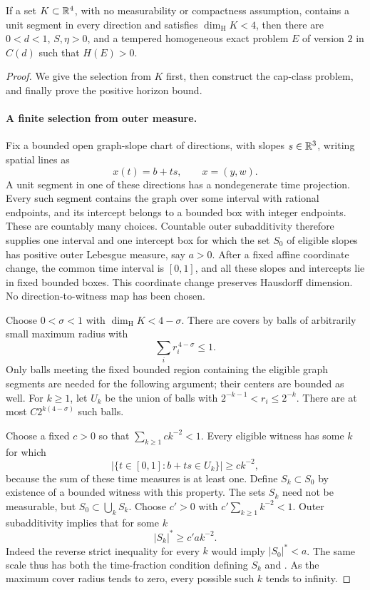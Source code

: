 \begin{theorem}
\label{thm:model-reduction}
If a set \(K\subset\mathbb R^4\), with no measurability or
compactness assumption, contains a unit segment in every
direction and satisfies \(\dim_{\mathrm H}K<4\), then
there are \(0<d<1\), \(S,\eta>0\), and a tempered
homogeneous exact problem \(E\) of version \(2\) in
\(C(d)\) such that \(H(E)>0\).
\end{theorem}

\begin{proof}
We give the selection from \(K\) first, then construct
the cap-class problem, and finally prove the positive
horizon bound.

\paragraph{A finite selection from outer measure.}
Fix a bounded open graph-slope chart of directions,
with slopes \(s\in\mathbb R^3\), writing spatial lines as
\[
 x(t)=b+ts,\qquad x=(y,w).
\]
A unit segment in one of these directions has a
nondegenerate time projection.  Every such segment
contains the graph over some interval with rational
endpoints, and its intercept belongs to a bounded box
with integer endpoints.  These are countably many
choices.  Countable outer subadditivity therefore
supplies one interval and one intercept box for which
the set \(S_0\) of eligible slopes has positive outer
Lebesgue measure, say \(a>0\).
After a fixed affine coordinate change, the common
time interval is \([0,1]\), and all these slopes and
intercepts lie in fixed bounded boxes.
This coordinate change preserves Hausdorff dimension.
No direction-to-witness map has been chosen.

Choose \(0<\sigma<1\) with
\(\dim_{\mathrm H}K<4-\sigma\).
There are covers by balls of arbitrarily small
maximum radius with
\[
 \sum_i r_i^{\,4-\sigma}\le1.
\]
Only balls meeting the fixed bounded region containing
the eligible graph segments are needed for the
following argument; their centers are bounded as well.
For \(k\ge1\), let \(U_k\) be the union of balls with
\(2^{-k-1}<r_i\le2^{-k}\).
There are at most \(C2^{k(4-\sigma)}\) such balls.

Choose a fixed \(c>0\) so that
\(\sum_{k\ge1}ck^{-2}<1\).
Every eligible witness has some \(k\) for which
\[
 |\{t\in[0,1]:b+ts\in U_k\}|\ge ck^{-2},
\]
because the sum of these time measures is at least one.
Define \(S_k\subset S_0\) by existence of a bounded
witness with this property.
The sets \(S_k\) need not be measurable, but
\(S_0\subset\bigcup_kS_k\).
Choose \(c'>0\) with
\(c'\sum_{k\ge1}k^{-2}<1\).
Outer subadditivity implies that for some \(k\)
\begin{equation}
 |S_k|^*\ge c'a k^{-2}.
 \label{a01:productive-slopes}
\end{equation}
Indeed the reverse strict inequality for every \(k\)
would imply \(|S_0|^*<a\).
The same scale thus has both the time-fraction
condition defining \(S_k\) and
.
As the maximum cover radius tends to zero, every
possible such \(k\) tends to infinity.


\end{proof}
